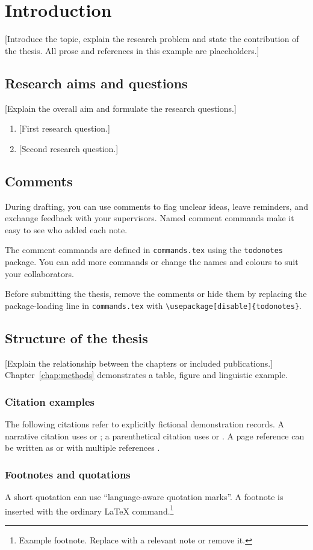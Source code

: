 \chapter{Introduction}
\label{chap:introduction}
[Introduce the topic, explain the research problem and state the contribution
of the thesis. All prose and references in this example are placeholders.]

\section{Research aims and questions}
[Explain the overall aim and formulate the research questions.]
\begin{enumerate}
  \item {}[First research question.]
  \item {}[Second research question.]
\end{enumerate}

\section{Comments}

During drafting, you can use comments to flag unclear ideas, leave
reminders, and exchange feedback with your supervisors. Named comment
commands make it easy to see who added each note.


The comment commands are defined in \texttt{commands.tex} using the
\texttt{todonotes} package. You can add more commands or change the
names and colours to suit your collaborators.

Before submitting the thesis, remove the comments or hide them by
replacing the package-loading line in \texttt{commands.tex} with
\verb|\usepackage[disable]{todonotes}|.


\section{Structure of the thesis}
[Explain the relationship between the chapters or included publications.]
Chapter~\ref{chap:methods} demonstrates a table, figure and linguistic example.

\subsection*{Citation examples}
The following citations refer to explicitly fictional demonstration records.
A narrative citation uses \citet{examplebook} or \citet[22]{examplebook}; a parenthetical citation uses
\citep{examplearticle} or \citep[10]{examplearticle}. A page reference can be written as
\citep[12--14]{examplebook} or with multiple references \citetext{\citealp[30--44]{examplebook}; \citealp{examplearticle}}.

\subsection*{Footnotes and quotations}
A short quotation can use \enquote{language-aware quotation marks}.
A footnote is inserted with the ordinary LaTeX command.\footnote{Example
footnote. Replace with a relevant note or remove it.}
